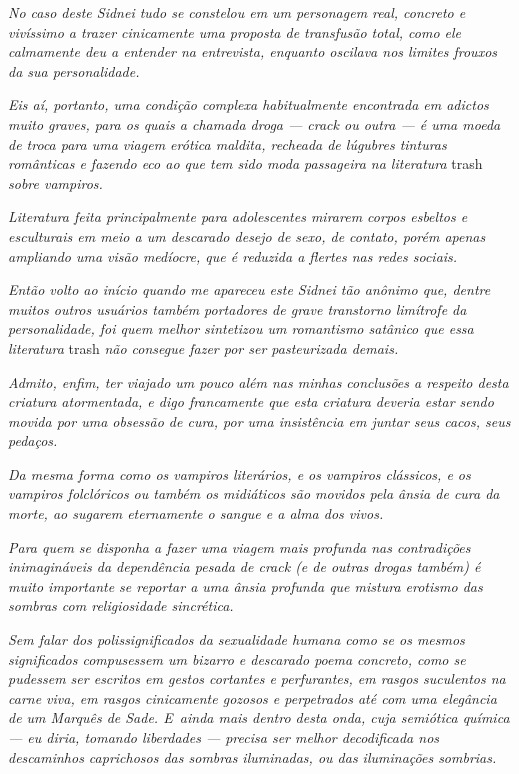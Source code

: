 \emph{No caso deste Sidnei tudo se constelou em um personagem real,
concreto e vivíssimo a trazer cinicamente uma proposta de transfusão
total, como ele calmamente deu a entender na entrevista, enquanto
oscilava nos limites frouxos da sua personalidade.}~

\emph{Eis aí, portanto, uma condição complexa habitualmente encontrada
em adictos muito graves, para os quais a chamada droga --- crack ou outra
--- é uma moeda de troca para uma viagem erótica maldita, recheada de
lúgubres tinturas românticas e fazendo eco ao que tem sido moda
passageira na literatura} trash \emph{sobre vampiros.}~

\emph{Literatura feita principalmente para adolescentes mirarem corpos
esbeltos e esculturais em meio a um descarado desejo de sexo, de
contato, porém apenas ampliando uma visão medíocre, que é reduzida a
flertes nas redes sociais.}~

\emph{Então volto ao início quando me apareceu este Sidnei tão anônimo
que, dentre muitos outros usuários também portadores de grave transtorno
limítrofe da personalidade, foi quem melhor sintetizou um romantismo
satânico que essa literatura} trash \emph{não consegue fazer por ser
pasteurizada demais.}~

\emph{Admito, enfim, ter viajado um pouco além nas minhas conclusões a
respeito desta criatura atormentada, e digo francamente que esta
criatura deveria estar sendo movida por uma obsessão de cura, por uma
insistência em juntar seus cacos, seus pedaços.}~

\emph{Da mesma forma como os vampiros literários, e os vampiros
clássicos, e os vampiros folclóricos ou também os midiáticos são movidos
pela ânsia de cura da morte, ao sugarem eternamente o sangue e a alma
dos vivos.}~

\emph{Para quem se disponha a fazer uma viagem mais profunda nas
contradições inimagináveis da dependência pesada de crack (e de outras
drogas também) é muito importante se reportar a uma ânsia profunda que
mistura erotismo das sombras com religiosidade sincrética.}~

\emph{Sem falar dos polissignificados da sexualidade humana como se os
mesmos significados compusessem um bizarro e descarado poema concreto,
como se pudessem ser escritos em gestos cortantes e perfurantes, em
rasgos suculentos na carne viva, em rasgos cinicamente gozosos e
perpetrados até com uma elegância de um Marquês de Sade. E~ainda mais
dentro desta onda, cuja semiótica química --- eu diria, tomando
liberdades --- precisa ser melhor decodificada nos descaminhos
caprichosos das sombras iluminadas, ou das iluminações sombrias.}~

